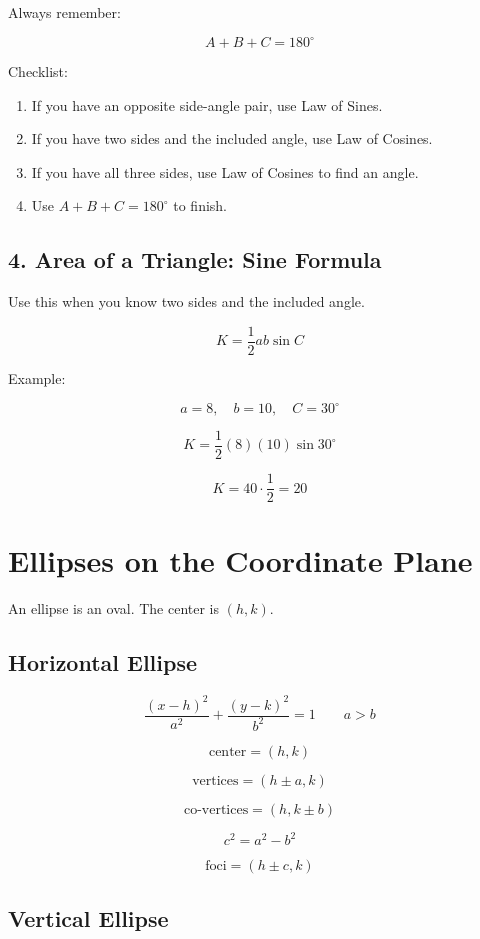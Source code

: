 \documentclass[11pt]{article}
\begin{document}
Always remember:

\[
A+B+C=180^\circ
\]

Checklist:

\begin{enumerate}
  \item If you have an opposite side-angle pair, use Law of Sines.
  \item If you have two sides and the included angle, use Law of Cosines.
  \item If you have all three sides, use Law of Cosines to find an angle.
  \item Use \(A+B+C=180^\circ\) to finish.
\end{enumerate}

\subsection*{4. Area of a Triangle: Sine Formula}

Use this when you know two sides and the included angle.

\[
K=\frac{1}{2}ab\sin C
\]

Example:

\[
a=8,\quad b=10,\quad C=30^\circ
\]

\[
K=\frac{1}{2}(8)(10)\sin30^\circ
\]

\[
K=40\cdot\frac{1}{2}=20
\]

\section*{Ellipses on the Coordinate Plane}

An ellipse is an oval. The center is \((h,k)\).

\subsection*{Horizontal Ellipse}

\[
\frac{(x-h)^2}{a^2}+\frac{(y-k)^2}{b^2}=1
\qquad
a>b
\]

\[
\text{center}=(h,k)
\]

\[
\text{vertices}=(h\pm a,k)
\]

\[
\text{co-vertices}=(h,k\pm b)
\]

\[
c^2=a^2-b^2
\]

\[
\text{foci}=(h\pm c,k)
\]

\subsection*{Vertical Ellipse}
\end{document}
